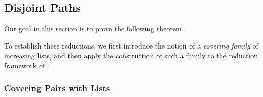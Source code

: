 \documentclass[11pt]{article}
\theoremstyle{definition}
\newtheorem{lemma}[theorem]{Lemma}
\begin{document}

    




\subsection{Disjoint Paths}

Our goal in this section is to prove the following theorem.

\lbdp*

To establish these reductions, we first introduce the notion of a \emph{covering family} of increasing lists, and then apply the construction of such a family to the reduction framework of \cite{Slivkins2010}.



\subsubsection*{Covering Pairs with Lists}
\end{document}
